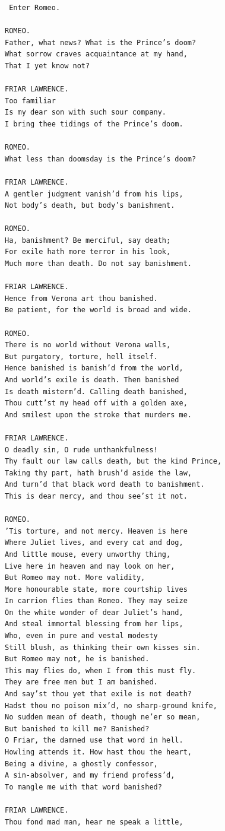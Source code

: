 \documentclass{article}
\begin{document}
\begin{verbatim}
 Enter Romeo.

ROMEO.
Father, what news? What is the Prince’s doom?
What sorrow craves acquaintance at my hand,
That I yet know not?

FRIAR LAWRENCE.
Too familiar
Is my dear son with such sour company.
I bring thee tidings of the Prince’s doom.

ROMEO.
What less than doomsday is the Prince’s doom?

FRIAR LAWRENCE.
A gentler judgment vanish’d from his lips,
Not body’s death, but body’s banishment.

ROMEO.
Ha, banishment? Be merciful, say death;
For exile hath more terror in his look,
Much more than death. Do not say banishment.

FRIAR LAWRENCE.
Hence from Verona art thou banished.
Be patient, for the world is broad and wide.

ROMEO.
There is no world without Verona walls,
But purgatory, torture, hell itself.
Hence banished is banish’d from the world,
And world’s exile is death. Then banished
Is death misterm’d. Calling death banished,
Thou cutt’st my head off with a golden axe,
And smilest upon the stroke that murders me.

FRIAR LAWRENCE.
O deadly sin, O rude unthankfulness!
Thy fault our law calls death, but the kind Prince,
Taking thy part, hath brush’d aside the law,
And turn’d that black word death to banishment.
This is dear mercy, and thou see’st it not.

ROMEO.
’Tis torture, and not mercy. Heaven is here
Where Juliet lives, and every cat and dog,
And little mouse, every unworthy thing,
Live here in heaven and may look on her,
But Romeo may not. More validity,
More honourable state, more courtship lives
In carrion flies than Romeo. They may seize
On the white wonder of dear Juliet’s hand,
And steal immortal blessing from her lips,
Who, even in pure and vestal modesty
Still blush, as thinking their own kisses sin.
But Romeo may not, he is banished.
This may flies do, when I from this must fly.
They are free men but I am banished.
And say’st thou yet that exile is not death?
Hadst thou no poison mix’d, no sharp-ground knife,
No sudden mean of death, though ne’er so mean,
But banished to kill me? Banished?
O Friar, the damned use that word in hell.
Howling attends it. How hast thou the heart,
Being a divine, a ghostly confessor,
A sin-absolver, and my friend profess’d,
To mangle me with that word banished?

FRIAR LAWRENCE.
Thou fond mad man, hear me speak a little,


\end{verbatim}
\end{document}
